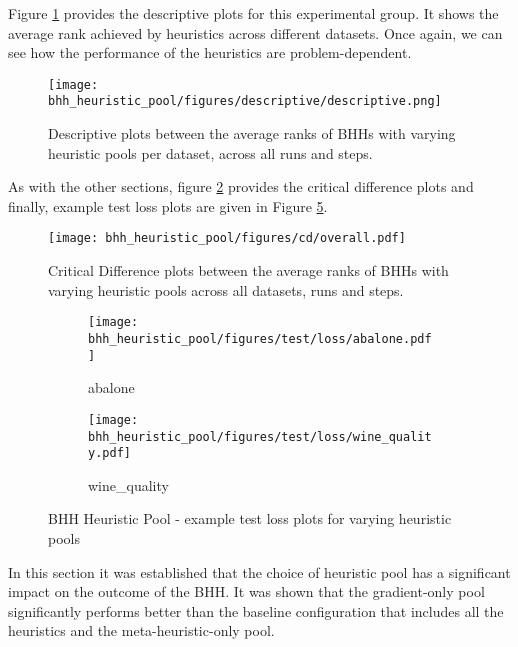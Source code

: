 Figure \ref{fig:results:heuristic_pool:descriptive:descriptive} provides the descriptive plots for this experimental group. It shows the average rank achieved by heuristics across different datasets. Once again, we can see how the performance of the heuristics are problem-dependent.

\begin{figure}[htbp]
      \centering
      \texttt{[image: bhh\_heuristic\_pool/figures/descriptive/descriptive.png]}
      \caption{Descriptive plots between the average ranks of \Acsp{BHH} with varying heuristic pools per dataset, across all runs and steps.}
      \label{fig:results:heuristic_pool:descriptive:descriptive}
\end{figure}

As with the other sections, figure \ref{fig:results:heuristic_pool:descriptive:cd} provides the critical difference plots and finally, example test loss plots are given in Figure \ref{fig:results:heuristic_pool:figures:loss}.

\begin{figure}[htbp]
      \centering
      \texttt{[image: bhh\_heuristic\_pool/figures/cd/overall.pdf]}
      \caption{Critical Difference plots between the average ranks of \Acsp{BHH} with varying heuristic pools across all datasets, runs and steps.}
      \label{fig:results:heuristic_pool:descriptive:cd}
\end{figure}



\begin{figure}[htbp]
      \begin{subfigure}{0.5\textwidth}
            \centering
            \texttt{[image: bhh\_heuristic\_pool/figures/test/loss/abalone.pdf]}
            \caption{abalone}
            \label{fig:results:heuristic_pool:figures:loss1}
      \end{subfigure}
      \begin{subfigure}{0.5\textwidth}
            \centering
            \texttt{[image: bhh\_heuristic\_pool/figures/test/loss/wine\_quality.pdf]}
            \caption{wine\_quality}
            \label{fig:results:heuristic_pool:figures:loss2}
      \end{subfigure}
      \caption{\Acs{BHH} Heuristic Pool - example test loss plots for varying heuristic pools}
      \label{fig:results:heuristic_pool:figures:loss}
\end{figure}

In this section it was established that the choice of heuristic pool has a significant impact on the outcome of the \Ac{BHH}. It was shown that the gradient-only pool significantly performs better than the baseline configuration that includes all the heuristics and the meta-heuristic-only pool.

